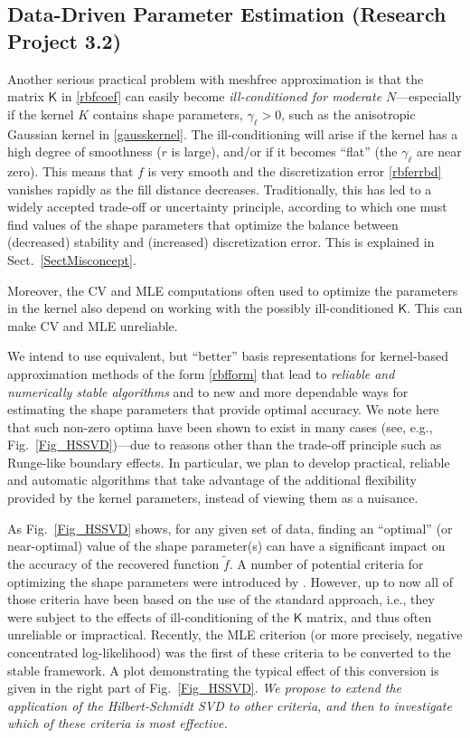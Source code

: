 \documentclass[11pt]{NSFamsart}
\newcommand{\tf}{\tilde{f}}
\newcommand{\mK}{\mathsf{K}}
\begin{document}
\subsection{Data-Driven Parameter Estimation (Research Project 3.2)} Another serious practical problem with meshfree approximation is that the matrix $\mK$ in \eqref{rbfcoef} can easily become \emph{ill-conditioned for moderate $N$}---especially if the kernel $K$ contains shape parameters, $\gamma_\ell>0$, such as the anisotropic Gaussian kernel in \eqref{gausskernel}.  The ill-conditioning will arise if the kernel has a high degree of smoothness ($r$ is large), and/or if it becomes ``flat'' (the $\gamma_\ell$ are near zero). This means that $f$ is very smooth and the discretization error \eqref{rbferrbd} vanishes rapidly as the fill distance decreases.
Traditionally, this has led to a widely accepted trade-off or uncertainty principle, according to which one must find values of the shape parameters that optimize the balance between (decreased) stability and (increased) discretization error.  This is explained in Sect.\ \ref{SectMisconcept}.

Moreover, the CV and MLE computations often used to optimize the parameters in the kernel also depend on working with the possibly ill-conditioned $\mK$.  This can make CV and MLE unreliable.

We intend to use equivalent, but ``better'' basis representations for kernel-based approximation methods of the form \eqref{rbfform} that lead to \emph{reliable and numerically stable algorithms} and to new and more dependable ways for estimating the shape parameters that provide optimal accuracy. We note here that such non-zero optima have been shown to exist in many cases (see, e.g., Fig.~\ref{Fig_HSSVD})---due to reasons other than the trade-off principle such as Runge-like boundary effects. In particular, we plan to develop practical, reliable and automatic algorithms that take advantage of the additional flexibility provided by the kernel parameters, instead of viewing them as a nuisance.

As Fig.~\ref{Fig_HSSVD} shows, for any given set of data, finding an ``optimal'' (or near-optimal) value of the shape parameter(s) can have a significant impact on the accuracy of the recovered function $\tf$. A number of potential criteria for optimizing the shape parameters were introduced by \cite{Fasshauer11}. However, up to now all of those criteria have been based on the use of the standard approach, i.e., they were subject to the effects of ill-conditioning of the $\mK$ matrix, and thus often unreliable or impractical. Recently, the MLE criterion (or more precisely, negative concentrated log-likelihood) was the first of these criteria to be converted to the stable framework. A plot demonstrating the typical effect of this conversion is given in the right part of Fig.~\ref{Fig_HSSVD}. \emph{We propose to extend the application of the Hilbert-Schmidt SVD to other criteria, and then to investigate which of these criteria is most effective.}
\end{document}

